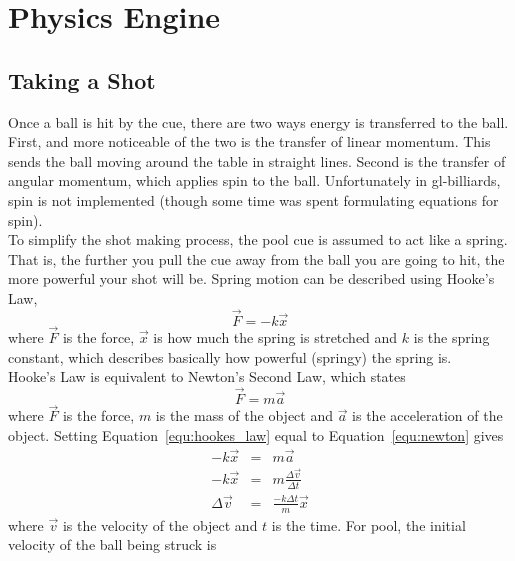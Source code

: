 \newcommand{\pvec}[1]{\vec{#1}\mkern2mu\vphantom{#1}}

\section{Physics Engine}

    \subsection{Taking a Shot}
    Once a ball is hit by the cue, there are two ways energy is transferred to the ball. First, and more noticeable of the two
    is the transfer of linear momentum. This sends the ball moving around the table in straight lines. Second is the transfer
    of angular momentum, which applies spin to the ball. Unfortunately in gl-billiards, spin is not implemented (though some
    time was spent formulating equations for spin). \\
    To simplify the shot making process, the pool cue is assumed to act like a spring. That is, the further you pull
    the cue away from the ball you are going to hit, the more powerful your shot will be. Spring motion can be described
    using Hooke's Law,
    \begin{equation}
        \vec F = -k \vec x
        \label{equ:hookes_law}
    \end{equation}
    where $\vec F$ is the force, $\vec x$ is how much the spring is stretched and $k$ is the spring constant, which
    describes basically how powerful (springy) the spring is.
    \\
    Hooke's Law is equivalent to Newton's Second Law, which states
    \begin{equation}
        \vec F = m \vec a
        \label{equ:newton}
    \end{equation}
    where $\vec F$ is the force, $m$ is the mass of the object and $\vec a$ is the acceleration of the object. Setting
    Equation~\ref{equ:hookes_law} equal to Equation~\ref{equ:newton} gives
    \begin{eqnarray}
        -k \vec x &=& m \vec a \nonumber \\
        -k \vec x &=& m \frac{\Delta \vec v}{\Delta t} \nonumber \\
        \Delta \vec v &=& \frac{-k \Delta t}{m}\vec x  \nonumber
    \end{eqnarray}
    where $\vec v$ is the velocity of the object and $t$ is the time. For pool, the initial velocity of the ball being struck is
